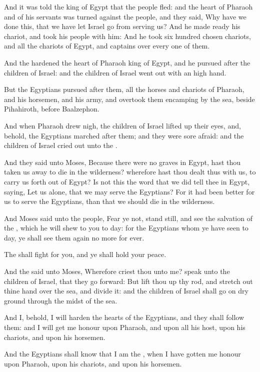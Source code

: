 \verse And it was told the king of Egypt that the people fled: and the heart of Pharaoh and of his servants was turned against the people, and they said, Why have we done this, that we have let Israel go from serving us?  \verse And he made ready his chariot, and took his people with him: \verse And he took six hundred chosen chariots, and all the chariots of Egypt, and captains over every one of them.

\verse And the \LORD hardened the heart of Pharaoh king of Egypt, and he pursued after the children of Israel: and the children of Israel went out with an high hand.

\verse But the Egyptians pursued after them, all the horses and chariots of Pharaoh, and his horsemen, and his army, and overtook them encamping by the sea, beside Pihahiroth, before Baalzephon.

\verse And when Pharaoh drew nigh, the children of Israel lifted up their eyes, and, behold, the Egyptians marched after them; and they were sore afraid: and the children of Israel cried out unto the \LORD.

\verse And they said unto Moses, Because there were no graves in Egypt, hast thou taken us away to die in the wilderness? wherefore hast thou dealt thus with us, to carry us forth out of Egypt?  \verse Is not this the word that we did tell thee in Egypt, saying, Let us alone, that we may serve the Egyptians? For it had been better for us to serve the Egyptians, than that we should die in the wilderness.

\verse And Moses said unto the people, Fear ye not, stand still, and see the salvation of the \LORD, which he will shew to you to day: for the Egyptians whom ye have seen to day, ye shall see them again no more for ever.

\verse The \LORD shall fight for you, and ye shall hold your peace.

\verse And the \LORD said unto Moses, Wherefore criest thou unto me?  speak unto the children of Israel, that they go forward: \verse But lift thou up thy rod, and stretch out thine hand over the sea, and divide it: and the children of Israel shall go on dry ground through the midst of the sea.

\verse And I, behold, I will harden the hearts of the Egyptians, and they shall follow them: and I will get me honour upon Pharaoh, and upon all his host, upon his chariots, and upon his horsemen.

\verse And the Egyptians shall know that I am the \LORD, when I have gotten me honour upon Pharaoh, upon his chariots, and upon his horsemen.


